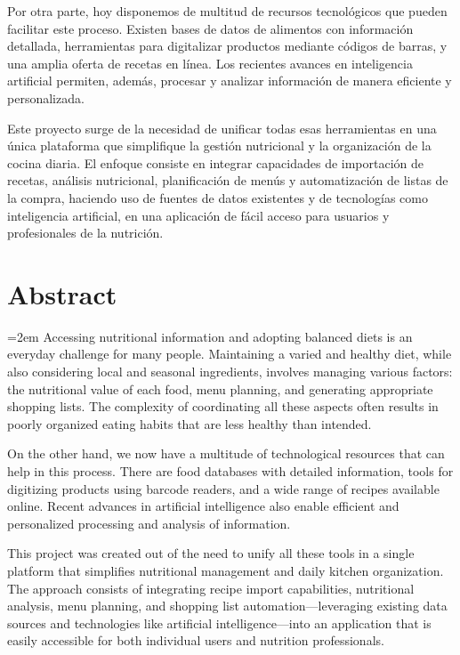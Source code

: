 \documentclass{article}
\begin{document}
Por otra parte, hoy disponemos de multitud de recursos tecnológicos que pueden facilitar este proceso. Existen bases de datos de alimentos con información detallada, herramientas para digitalizar productos mediante códigos de barras, y una amplia oferta de recetas en línea. Los recientes avances en inteligencia artificial permiten, además, procesar y analizar información de manera eficiente y personalizada.

Este proyecto surge de la necesidad de unificar todas esas herramientas en una única plataforma que simplifique la gestión nutricional y la organización de la cocina diaria. El enfoque consiste en integrar capacidades de importación de recetas, análisis nutricional, planificación de menús y automatización de listas de la compra, haciendo uso de fuentes de datos existentes y de tecnologías como inteligencia artificial, en una aplicación de fácil acceso para usuarios y profesionales de la nutrición.

\newpage

\section*{Abstract}
\begingroup
{}
\emergencystretch=2em
Accessing nutritional information and adopting balanced diets is an everyday challenge for many people. Maintaining a varied and healthy diet, while also considering local and seasonal ingredients, involves managing various factors: the nutritional value of each food, menu planning, and generating appropriate shopping lists. The complexity of coordinating all these aspects often results in poorly organized eating habits that are less healthy than intended.

On the other hand, we now have a multitude of technological resources that can help in this process. There are food databases with detailed information, tools for digitizing products using barcode readers, and a wide range of recipes available online. Recent advances in artificial intelligence also enable efficient and personalized processing and analysis of information.

This project was created out of the need to unify all these tools in a single platform that simplifies nutritional management and daily kitchen organization. The approach consists of integrating recipe import capabilities, nutritional analysis, menu planning, and shopping list automation—leveraging existing data sources and technologies like artificial intelligence—into an application that is easily accessible for both individual users and nutrition professionals.
\par
\endgroup
{}
\end{document}

